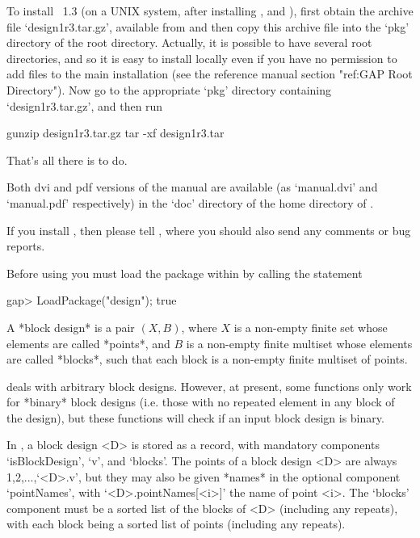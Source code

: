 To install {\DESIGN}~1.3 (on a UNIX system, after
installing {\GAP}, {\GRAPE} and {\GAPDoc}), first obtain
the {\DESIGN} archive file `design1r3.tar.gz', available from
 and then copy
this archive file into the `pkg' directory of the {\GAP} root
directory. Actually, it is possible to have several {\GAP} root
directories, and so it is easy to install {\DESIGN} locally even if you
have no permission to add files to the main {\GAP} installation (see the
{\GAP} reference manual section "ref:GAP Root Directory").  Now go to the
appropriate `pkg' directory containing `design1r3.tar.gz', and then run

\begintt
gunzip design1r3.tar.gz
tar -xf design1r3.tar
\endtt

That's all there is to do.

Both dvi and pdf versions of the {\DESIGN} manual are available
(as `manual.dvi' and `manual.pdf' respectively) in the `doc' directory
of the home directory of {\DESIGN}.

If you install {\DESIGN}, then please tell
, where you should also send any comments
or bug reports.


Before using {\DESIGN} you must load the package within {\GAP} by calling 
the statement

\begintt
gap> LoadPackage("design");
true
\endtt


A *block design* is a pair $(X,B)$, where $X$ is a non-empty finite
set whose elements are called *points*, and $B$ is a non-empty finite
multiset whose elements are called *blocks*, such that each block   
is a non-empty finite multiset of points.
  
{\DESIGN} deals with arbitrary block designs. However, at present,  
some {\DESIGN} functions only work for *binary* block designs 
(i.e. those with no repeated element in any block of the design),
but these functions will check if an input block design is binary.

In {\DESIGN}, a block design <D> is stored as a record, with mandatory
components `isBlockDesign', `v', and `blocks'.  The points of a block
design <D> are always 1,2,...,`<D>.v', but they may also be given *names*
in the optional component `pointNames', with `<D>.pointNames[<i>]'
the name of point <i>.  The `blocks' component must be a sorted list
of the blocks of <D> (including any repeats), with each block being a
sorted list of points (including any repeats). 

